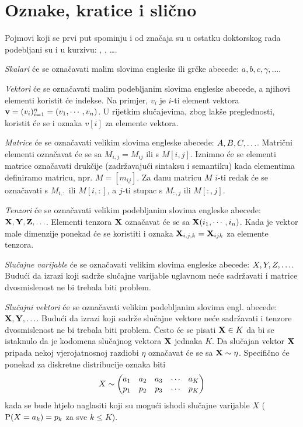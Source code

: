 \section*{Oznake, kratice i slično}

Pojmovi koji se prvi put spominju i od značaja su u ostatku
doktorskog rada podebljani su i u kurzivu:
, , \ldots.

\emph{Skalari} će se označavati malim slovima engleske ili 
grčke abecede: $a,b,c,\gamma,\ldots$.

\emph{Vektori} će se označavati malim podebljanim slovima engleske
abecede, a njihovi elementi koristit će indekse.
Na primjer, $v_i$ je $i$-ti element vektora
$\tv{v}=(v_i)_{i=1}^{n}=(v_1,\cdots,v_n)$.
U rijetkim slučajevima, zbog lakše preglednosti,
koristit će se i oznaka $v[i]$ za elemente vektora.

\emph{Matrice} će se označavati velikim slovima engleske
abecede: $\tmatrix{A},\tmatrix{B},\tmatrix{C},\ldots$.
Matrični elementi označavat će se sa
$M_{i,j}=M_{ij}$ ili s $M[i,j]$. Iznimno
će se elementi matrice označavati drukčije
(zadržavajući sintaksu i semantiku) kada
elementima definiramo matricu, npr. $M=[m_{ij}]$.
Za danu matricu $M$
$i$-ti redak će se označavati s $M_{i,:}$ ili $M[i,:]$,
a $j$-ti stupac s $M_{:,j}$ ili $M[:,j]$.


\emph{Tenzori} će se označavati velikim podebljanim slovima
engleske abecede: $\ttenzor{X}, \ttenzor{Y}, \ttenzor{Z},\ldots$.
Elementi tenzora $\ttenzor{X}$ označavat
će se sa $\ttenzor{X}(i_{1},\cdots,i_{n})$. Kada je vektor male dimenzije
ponekad će se koristiti i oznaka $\ttenzor{X}_{i,j,k}=\ttenzor{X}_{ijk}$
za elemente tenzora.

\emph{Slučajne varijable} će se označavati velikim slovima
engleske abecede: $\tsvar{X}, \tsvar{Y}, \tsvar{Z},\ldots$.
Budući da izrazi koji sadrže slučajne varijable uglavnom neće sadržavati
i matrice dvosmislenost ne bi trebala biti problem.

\emph{Slučajni vektori} će se označavati velikim podebljanim slovima
engl. abecede: $\tsvek{X}, \tsvek{Y}, \ldots$.
Budući da izrazi koji sadrže slučajne vektore  neće sadržavati
i tenzore dvosmislenost ne bi trebala biti problem.
Često će se pisati $\tsvek{X} \in K$ da bi se istaknulo
da je kodomena slučajnog vektora $\tsvek{X}$ jednaka $K$.
Da slučajan vektor $\tsvek{X}$ pripada nekoj vjerojatnosnoj
razdiobi $\eta$ označavat će se sa $\tsvek{X}\sim \eta$.
Specifično će ponekad za diskretne distribucije oznaka biti
\[
	\tsvar{X} \sim
	\begin{pmatrix}
	a_1 & a_2 & a_3 & \cdots & a_K \\
	p_{1} & p_{2} & p_{3} & \cdots & p_{K} \\
	\end{pmatrix}
\]
kada se bude htjelo naglasiti koji su mogući ishodi slučajne varijable $X$
($\vP (\tsvar{X} = a_k) = p_{k}$ za sve $k \leq K$). 


